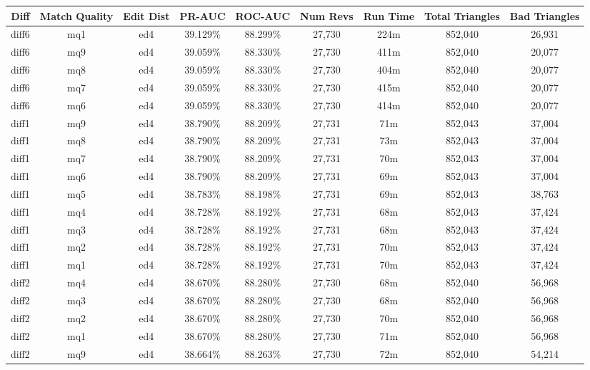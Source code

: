 \begin{sidewaystable}[!ph]
  \begin{center}
    \begin{tabular}{|c|c|c||c|c||c|c|c|c|}
\hline
Diff & Match Quality & Edit Dist
        & PR-AUC & ROC-AUC
        & Num Revs & Run Time
        & Total Triangles & Bad Triangles \\
\hline
\hline
diff6 & mq1 & ed4 & 39.129\% & 88.299\% & 27,730 & 224m & 852,040 & 26,931 \\
diff6 & mq9 & ed4 & 39.059\% & 88.330\% & 27,730 & 411m & 852,040 & 20,077 \\
diff6 & mq8 & ed4 & 39.059\% & 88.330\% & 27,730 & 404m & 852,040 & 20,077 \\
diff6 & mq7 & ed4 & 39.059\% & 88.330\% & 27,730 & 415m & 852,040 & 20,077 \\
diff6 & mq6 & ed4 & 39.059\% & 88.330\% & 27,730 & 414m & 852,040 & 20,077 \\
diff1 & mq9 & ed4 & 38.790\% & 88.209\% & 27,731 & 71m & 852,043 & 37,004 \\
diff1 & mq8 & ed4 & 38.790\% & 88.209\% & 27,731 & 73m & 852,043 & 37,004 \\
diff1 & mq7 & ed4 & 38.790\% & 88.209\% & 27,731 & 70m & 852,043 & 37,004 \\
diff1 & mq6 & ed4 & 38.790\% & 88.209\% & 27,731 & 69m & 852,043 & 37,004 \\
diff1 & mq5 & ed4 & 38.783\% & 88.198\% & 27,731 & 69m & 852,043 & 38,763 \\
diff1 & mq4 & ed4 & 38.728\% & 88.192\% & 27,731 & 68m & 852,043 & 37,424 \\
diff1 & mq3 & ed4 & 38.728\% & 88.192\% & 27,731 & 68m & 852,043 & 37,424 \\
diff1 & mq2 & ed4 & 38.728\% & 88.192\% & 27,731 & 70m & 852,043 & 37,424 \\
diff1 & mq1 & ed4 & 38.728\% & 88.192\% & 27,731 & 70m & 852,043 & 37,424 \\
diff2 & mq4 & ed4 & 38.670\% & 88.280\% & 27,730 & 68m & 852,040 & 56,968 \\
diff2 & mq3 & ed4 & 38.670\% & 88.280\% & 27,730 & 68m & 852,040 & 56,968 \\
diff2 & mq2 & ed4 & 38.670\% & 88.280\% & 27,730 & 70m & 852,040 & 56,968 \\
diff2 & mq1 & ed4 & 38.670\% & 88.280\% & 27,730 & 71m & 852,040 & 56,968 \\
diff2 & mq9 & ed4 & 38.664\% & 88.263\% & 27,730 & 72m & 852,040 & 54,214 \\

\end{tabular}
\end{center}
\end{sidewaystable}
